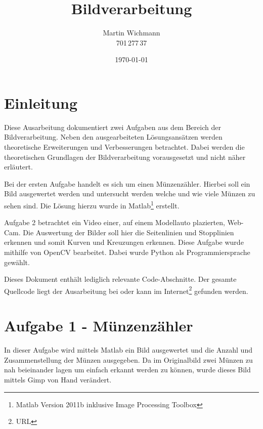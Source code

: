 \documentclass[a4paper,DIV=calc,ngerman]{scrartcl}
\begin{document}
\titlehead{}
\title{Bildverarbeitung}
\author{Martin Wichmann\\701\,277\,37}
\date{\today}

\maketitle
\tableofcontents

\thispagestyle{empty}

\newpage
\setcounter{page}{1}

\section{Einleitung}
\label{sec:Einleitung}
Diese Ausarbeitung dokumentiert zwei Aufgaben aus dem Bereich der Bildverarbeitung. Neben den ausgearbeiteten Lösungsansätzen werden theoretische Erweiterungen und Verbesserungen betrachtet. Dabei werden die theoretischen Grundlagen der Bildverarbeitung vorausgesetzt und nicht näher erläutert.

Bei der ersten Aufgabe handelt es sich um einen Münzenzähler. Hierbei soll ein Bild ausgewertet werden und untersucht werden welche und wie viele Münzen zu sehen sind. Die Lösung hierzu wurde in Matlab\footnote{Matlab Version 2011b inklusive Image Processing Toolbox} erstellt.

Aufgabe 2 betrachtet ein Video einer, auf einem Modellauto plazierten, Web-Cam. Die Auswertung der Bilder soll hier die Seitenlinien und Stopplinien erkennen und somit Kurven und Kreuzungen erkennen. Diese Aufgabe wurde mithilfe von OpenCV bearbeitet. Dabei wurde Python als Programmiersprache gewählt.

Dieses Dokument enthält lediglich relevante Code-Abschnitte. Der gesamte Quellcode liegt der Ausarbeitung bei oder kann im Internet\footnote{URL} gefunden werden.




\section{Aufgabe 1 - Münzenzähler}
\label{sec:aufgabe1}
In dieser Aufgabe wird mittels Matlab ein Bild ausgewertet und die Anzahl und Zusammenstellung der Münzen ausgegeben. Da im Originalbild zwei Münzen zu nah beieinander lagen um einfach erkannt werden zu können, wurde dieses Bild mittels Gimp von Hand verändert.
\end{document}
